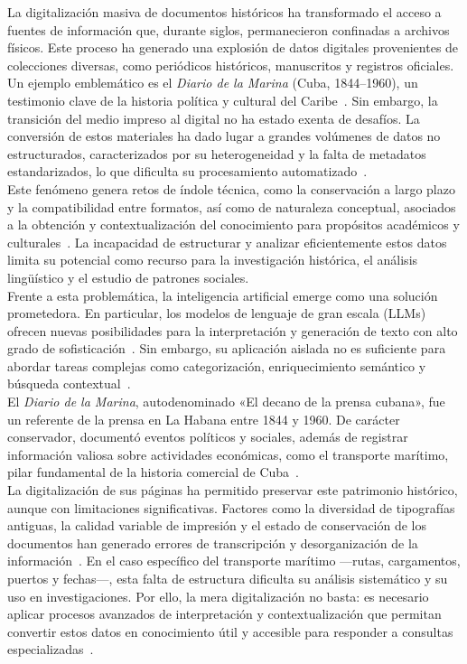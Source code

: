\introduction

\setlength{\parindent}{0pt} %
\setlength{\parskip}{10pt}  %

La digitalización masiva de documentos históricos ha transformado el acceso a fuentes de información que, durante siglos, permanecieron confinadas a archivos físicos. Este proceso ha generado una explosión de datos digitales provenientes de colecciones diversas, como periódicos históricos, manuscritos y registros oficiales. Un ejemplo emblemático es el \textit{Diario de la Marina} (Cuba, 1844–1960), un testimonio clave de la historia política y cultural del Caribe~\cite{wikipedia_diario}. Sin embargo, la transición del medio impreso al digital no ha estado exenta de desafíos. La conversión de estos materiales ha dado lugar a grandes volúmenes de datos no estructurados, caracterizados por su heterogeneidad y la falta de metadatos estandarizados, lo que dificulta su procesamiento automatizado~\cite{lucidea_metadata}.\\
Este fenómeno genera retos de índole técnica, como la conservación a largo plazo y la compatibilidad entre formatos, así como de naturaleza conceptual, asociados a la obtención y contextualización del conocimiento para propósitos académicos y culturales~\cite{lucidea_metadata}. La incapacidad de estructurar y analizar eficientemente estos datos limita su potencial como recurso para la investigación histórica, el análisis lingüístico y el estudio de patrones sociales.\\
Frente a esta problemática, la inteligencia artificial emerge como una solución prometedora. En particular, los modelos de lenguaje de gran escala (LLMs) ofrecen nuevas posibilidades para la interpretación y generación de texto con alto grado de sofisticación~\cite{proposed_llm}. Sin embargo, su aplicación aislada no es suficiente para abordar tareas complejas como categorización, enriquecimiento semántico y búsqueda contextual~\cite{proposed_llm}.\\ 
El \textit{Diario de la Marina}, autodenominado «El decano de la prensa cubana», fue un referente de la prensa en La Habana entre 1844 y 1960. De carácter conservador, documentó eventos políticos y sociales, además de registrar información valiosa sobre actividades económicas, como el transporte marítimo, pilar fundamental de la historia comercial de Cuba~\cite{wikipedia_diario}.\\
La digitalización de sus páginas ha permitido preservar este patrimonio histórico, aunque con limitaciones significativas. Factores como la diversidad de tipografías antiguas, la calidad variable de impresión y el estado de conservación de los documentos han generado errores de transcripción y desorganización de la información~\cite{enhancing_degraded}. En el caso específico del transporte marítimo —rutas, cargamentos, puertos y fechas—, esta falta de estructura dificulta su análisis sistemático y su uso en investigaciones. Por ello, la mera digitalización no basta: es necesario aplicar procesos avanzados de interpretación y contextualización que permitan convertir estos datos en conocimiento útil y accesible para responder a consultas especializadas~\cite{ai_assisted, enhancing_degraded}.


